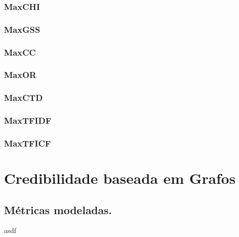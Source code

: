 \subsubsection{MaxCHI}
\label{subsubsection::maxchi}

\subsubsection{MaxGSS}
\label{subsubsection::maxgss}

\subsubsection{MaxCC}
\label{subsubsection::maxcc}

\subsubsection{MaxOR}
\label{subsubsection::maxor}

\subsubsection{MaxCTD}
\label{subsubsection::maxctd}

\subsubsection{MaxTFIDF}
\label{subsubsection::maxtfidf}

\subsubsection{MaxTFICF} 
\label{subsubsection::maxtficf}

\cite{ChihHow04}

\section{Credibilidade baseada em Grafos}
\label{sec::pg_cred_baseada_grafos}

\subsection{Métricas modeladas.}
\label{subsec::pg_metricas_grafos}

asdf


